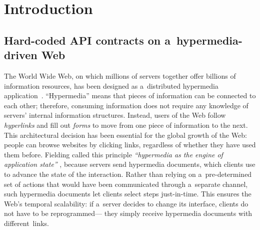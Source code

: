 % 
% 
% 

\section{Introduction}

\subsection{Hard-coded API contracts on a~hypermedia-driven Web}
The World Wide Web,
on which millions of servers together offer billions of information resources,
has been designed as a~distributed hypermedia application~\cite{bernerslee_1992}.
\enquote{Hypermedia} means that pieces of information can be connected to each other;
therefore, consuming information
does not require any knowledge of servers' internal information structures.
Instead, users of the Web follow \emph{hyperlinks} and fill out \emph{forms}
to move from one piece of information to the next.
This architectural decision has been essential for the global growth of the Web:
people can browse websites by clicking links,
regardless of whether they have used them before.
Fielding called this principle
\emph{\enquote{hypermedia as the engine of application state}} \cite{REST},
because servers send hypermedia documents,
which clients use to advance the state of the interaction.
Rather than relying on a~pre-determined set of actions
that would have been communicated through a~separate channel,
such hypermedia documents let clients select steps just-in-time.
This ensures the Web's temporal scalability:
if a~server decides to change its interface,
clients do not have to be reprogrammed---%
they simply receive hypermedia documents with different~links.

